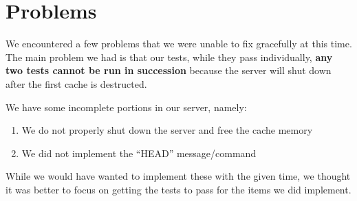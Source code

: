 \documentclass[12pt]{article}
\begin{document}
\section{Problems}
We encountered a few problems that we were unable to fix gracefully at this time. The main problem we had is that our tests, while they pass individually, \textbf{any two tests cannot be run in succession} because the server will shut down after the first cache is destructed.

We have some incomplete portions in our server, namely:
\begin{enumerate}
\item We do not properly shut down the server and free the cache memory
\item We did not implement the ``HEAD'' message/command
\end{enumerate}
While we would have wanted to implement these with the given time, we thought it was better to focus on getting the tests to pass for the items we did implement.
\end{document}
